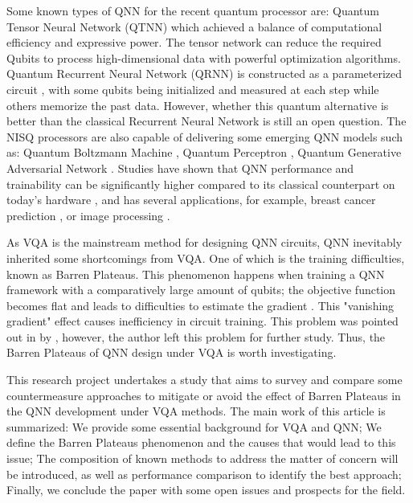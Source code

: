 Some known types of QNN for the recent quantum processor are: 
Quantum Tensor Neural Network (QTNN) \cite{hugginsQuantumMachineLearning2019} which achieved a balance of computational efficiency and expressive power. 
The tensor network can reduce the required Qubits to process high-dimensional data with powerful optimization algorithms.
Quantum Recurrent Neural Network (QRNN) is constructed as a parameterized circuit \cite{takakiLearningTemporalData2021}, with some qubits being initialized and measured at each step while others memorize the past data.
However, whether this quantum alternative is better than the classical Recurrent Neural Network is still an open question.
The NISQ processors are also capable of delivering some emerging QNN models such as: 
Quantum Boltzmann Machine \cite{shinguBoltzmannMachineLearning2021}\cite{zoufalVariationalQuantumBoltzmann2021}, 
Quantum Perceptron \cite{kristensenArtificialSpikingQuantum2021}, 
Quantum Generative Adversarial Network \cite{dallaire-demersQuantumGenerativeAdversarial2018}\cite{lloydQuantumGenerativeAdversarial2018}. Studies have shown that QNN performance and trainability can be significantly higher compared to its classical counterpart on today's hardware \cite{abbasPowerQuantumNeural2021, colesSeekingQuantumAdvantage2021}, and has several applications, for example, breast cancer prediction \cite{liModelAlgorithmQuantuminspired2014}, or image processing \cite{matsuiQubitNeuralNetwork2009}.

As VQA is the mainstream method for designing QNN circuits, QNN inevitably inherited some shortcomings from VQA.
One of which is the training difficulties, known as Barren Plateaus.
This phenomenon happens when training a QNN framework with a comparatively large amount of qubits; the objective function becomes flat and leads to difficulties to estimate the gradient \cite{mccleanBarrenPlateausQuantum2018, zhaoAnalyzingBarrenPlateau2021}. This "vanishing gradient" effect causes inefficiency in circuit training. 
This problem was pointed out in \cite{abbasPowerQuantumNeural2021} by \citeauthor{abbasPowerQuantumNeural2021}, however, the author left this problem for further study. 
Thus, the Barren Plateaus of QNN design under VQA is worth investigating.

This research project undertakes a study that aims to survey and compare some countermeasure approaches to mitigate or avoid the effect of Barren Plateaus in the QNN development under VQA methods. 
The main work of this article is summarized: 
We provide some essential background for VQA and QNN;
We define the Barren Plateaus phenomenon and the causes that would lead to this issue; 
The composition of known methods to address the matter of concern will be introduced, as well as performance comparison to identify the best approach; 
Finally, we conclude the paper with some open issues and prospects for the field.


